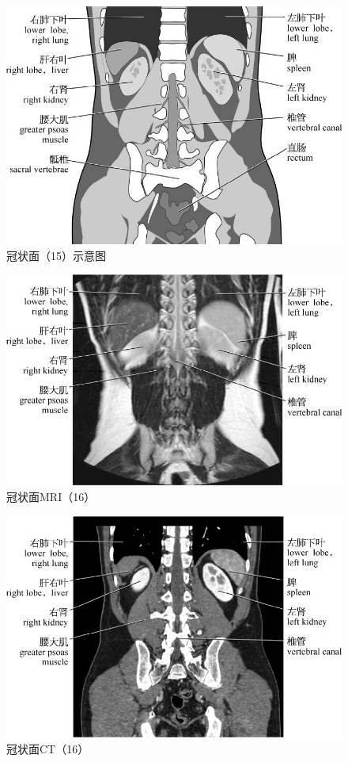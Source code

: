 \begin{figure}[!htbp]
 \centering
 \includegraphics{./images/Image00136.jpg}
 \captionsetup{justification=centering}
 \caption{冠状面（15）示意图}
  \end{figure} 
 \FloatBarrier

\begin{figure}[!htbp]
 \centering
 \includegraphics{./images/Image00137.jpg}
 \captionsetup{justification=centering}
 \caption{冠状面MRI（16）}
  \end{figure} 
 \FloatBarrier

\begin{figure}[!htbp]
 \centering
 \includegraphics{./images/Image00138.jpg}
 \captionsetup{justification=centering}
 \caption{冠状面CT（16）}
  \end{figure} 
 \FloatBarrier

